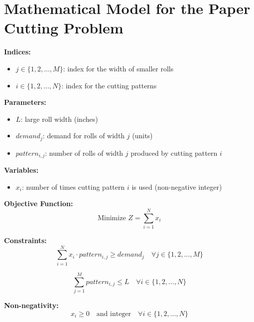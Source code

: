 \documentclass{article}
\begin{document}
\section*{Mathematical Model for the Paper Cutting Problem}

\textbf{Indices:}
\begin{itemize}
    \item $j \in \{1, 2, \ldots, M\}$: index for the width of smaller rolls
    \item $i \in \{1, 2, \ldots, N\}$: index for the cutting patterns
\end{itemize}

\textbf{Parameters:}
\begin{itemize}
    \item $L$: large roll width (inches)
    \item $demand_j$: demand for rolls of width $j$ (units)
    \item $pattern_{i,j}$: number of rolls of width $j$ produced by cutting pattern $i$
\end{itemize}

\textbf{Variables:}
\begin{itemize}
    \item $x_i$: number of times cutting pattern $i$ is used (non-negative integer)
\end{itemize}

\textbf{Objective Function:}
\begin{equation}
\text{Minimize } Z = \sum_{i=1}^{N} x_i
\end{equation}

\textbf{Constraints:}
\begin{equation}
\sum_{i=1}^{N} x_i \cdot pattern_{i,j} \geq demand_j \quad \forall j \in \{1, 2, \ldots, M\}
\end{equation}

\begin{equation}
\sum_{j=1}^{M} pattern_{i,j} \leq L \quad \forall i \in \{1, 2, \ldots, N\}
\end{equation}

\textbf{Non-negativity:}
\begin{equation}
x_i \geq 0 \quad \text{and integer} \quad \forall i \in \{1, 2, \ldots, N\}
\end{equation}
\end{document}

